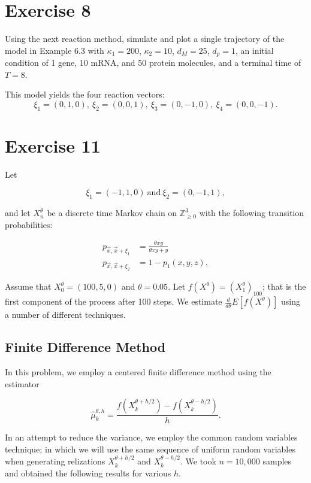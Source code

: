 \section{Exercise 8}\label{exercise-8}

Using the next reaction method, simulate and plot a single trajectory of
the model in Example 6.3 with \(\kappa_1 = 200\), \(\kappa_2 = 10\),
\(d_M = 25\), \(d_p = 1\), an initial condition of 1 gene, 10 mRNA, and
50 protein molecules, and a terminal time of \(T = 8\).

This model yields the four reaction vectors: \[
\xi_1 = (0,1,0),\ \xi_2 = (0,0,1),\ \xi_3 = (0,-1,0),\ \xi_4 = (0,0,-1).
\]

\section{Exercise 11}\label{exercise-11}

Let

\[
\xi_1 = (-1, 1, 0) \ \text{and}\ \xi_2 = (0, -1, 1),
\]

and let \(X^\theta_n\) be a discrete time Markov chain on
\(\mathbb{Z}^3_{\geq 0}\) with the following transition probabilities:

\begin{align}
p_{\vec x, \vec x + \xi_1} &= \frac{\theta xy}{\theta xy + y} \\
p_{\vec x, \vec x + \xi_2} &= 1 - p_1(x,y,z),
\end{align}

Assume that \(X^\theta_0 = (100, 5, 0)\) and \(\theta = 0.05\). Let
\(f(X^\theta) = \left(X^\theta_1\right)_{100}\); that is the first
component of the process after 100 steps. We estimate
\(\frac{d}{d\theta} E\left[f(X^\theta)\right]\) using a number of
different techniques.

\subsection{Finite Difference Method}\label{finite-difference-method}

In this problem, we employ a centered finite difference method using the
estimator

\[
\hat \mu^{\theta, h}_k
      = \frac{f(X^{\theta + h/2}_k) - f(X^{\theta - h/2}_k)}{h}.
\]

In an attempt to reduce the variance, we employ the common random
variables technique; in which we will use the same sequence of uniform
random variables when generating relizations \(X^{\theta + h/2}_k\) and
\(X^{\theta - h/2}_k\). We took \(n = 10,000\) samples and obtained the
following results for various \(h\).

